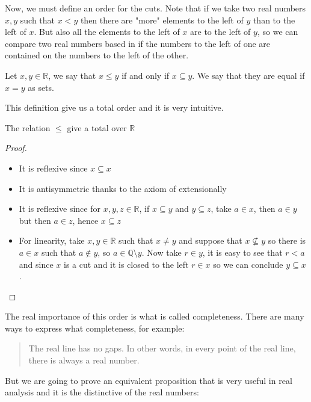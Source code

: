 \documentclass{tufte-handout}
\begin{document}
Now, we must define an order for the cuts. Note that if we take two real numbers $x, y$ such that $x < y$ then there are "more" elements to the left of $y$ than to the left of $x$. But also all the elements to the left of $x$ are to the left of $y$, so we can compare two real numbers based in if the numbers to the left of one are contained on the numbers to the left of the other.

\begin{definition}
	Let $x, y \in \mathbb{R}$, we say that $x \le y$ if and only if $x \subseteq y$. We say that they are equal if $x = y$ as sets.
\end{definition}

This definition give us a total order and it is very intuitive.
\begin{theorem}
	The relation $\le$ give a total over $\mathbb{R}$
\end{theorem}
\begin{proof}
	\begin{itemize}
		\item It is reflexive since $x \subseteq x$
		\item It is antisymmetric thanks to the axiom of extensionally
		\item It is reflexive since for $x, y, z \in \mathbb{R}$, if $x \subseteq y$ and $y \subseteq z$, take $ a \in x$, then $a \in y$ but then $a \in z$, hence $x \subseteq z$
		\item For linearity, take $x, y \in \mathbb{R}$ such that $x \neq y$ and suppose that $x \not \subseteq y$ so there is $a \in x$ such that $a \not \in y$, so $a \in \mathbb{Q} \setminus y$. Now take $r \in y$, it is easy to see that $r < a$ and since $x$ is a cut and it is closed to the left $r \in x$ so we can conclude $y \subseteq x$.
	\end{itemize}
\end{proof}

The real importance of this order is what is called completeness. There are many ways to express what completeness, for example:
\begin{quote}
	The real line has no gaps. In other words, in every point of the real line, there is always a real number.
\end{quote}
But we are going to prove an equivalent proposition that is very useful in real analysis and it is the distinctive of the real numbers:
\end{document}
